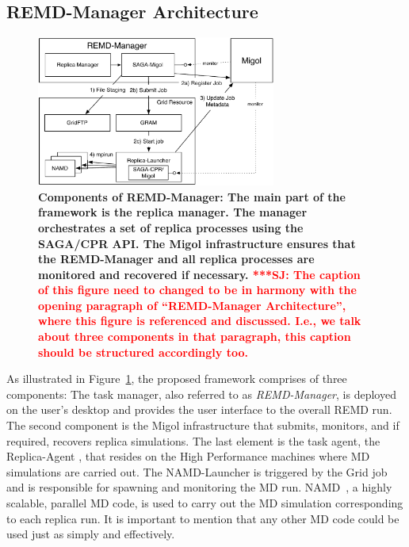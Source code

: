 \documentclass{rspublic}
\newcommand{\jhanote}[1]{ {\textcolor{red} { ***SJ: #1 }}}
\newcommand{\jhanote}[1]{}
\newcommand{\replicaagent}[1]{Replica-Agent }
\begin{document}
\subsection{REMD-Manager Architecture}
\begin{figure}[t]
      \centering
          \includegraphics[width=0.7\textwidth]{REMDgManager-architecture.pdf}
          \caption{\footnotesize \bf Components of REMD-Manager: The
            main part of the framework is the replica manager. The
            manager orchestrates a set of replica processes using the
            SAGA/CPR API. The Migol infrastructure ensures that the
            REMD-Manager and all replica processes are monitored and
            recovered if necessary. \jhanote{The caption of this
              figure need to changed to be in harmony with the opening
              paragraph of ``REMD-Manager Architecture'', where this
              figure is referenced and discussed. I.e., we talk about
              three components in that paragraph, this caption should
              be structured accordingly too.}}
      \label{fig:REMD-Manager-architecture}
\end{figure}

As illustrated in Figure~\ref{fig:REMD-Manager-architecture}, the
proposed framework comprises of three components: The task manager,
also referred to as \emph{REMD-Manager}, is deployed on the user's
desktop and provides the user interface to the overall REMD run. The
second component is the Migol infrastructure that submits, monitors,
and if required, recovers replica simulations.  The last element is
the task agent, the \replicaagent\ ,
 that resides on the High Performance machines where MD simulations
are carried out. The NAMD-Launcher is triggered by the Grid job and is
responsible for spawning and monitoring the MD
run. NAMD~\citep{Phillips:2005gd}, a highly scalable, parallel MD
code, is used to carry out the MD simulation corresponding to each
replica run. It is important to mention that any other MD code could
be used just as simply and effectively.
\end{document}
